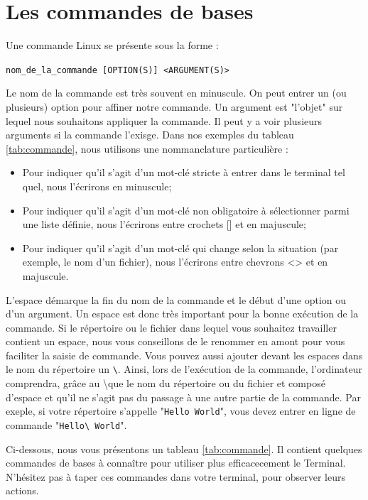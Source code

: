 \documentclass[12pt]{book}
\begin{document}
\section{Les commandes de bases}\label{sec:commandes}
	Une commande Linux se présente sous la forme :
	\begin{center}
		\texttt{nom\_de\_la\_commande [OPTION(S)] <ARGUMENT(S)>}
	\end{center}\par
	Le nom de la commande est très souvent en minuscule.
	On peut entrer un (ou plusieurs) option pour affiner notre commande.
	Un argument est "l'objet" sur lequel nous souhaitons appliquer la commande. Il peut y a voir plusieurs arguments si la commande l'exisge.
	Dans nos exemples du tableau \ref{tab:commande}, nous utilisons une nommanclature particulière :
	\begin{itemize}
		\item Pour indiquer qu'il s'agit d'un mot-clé stricte à entrer dans le terminal tel quel, nous l'écrirons en minuscule;
		\item Pour indiquer qu'il s'agit d'un mot-clé non obligatoire à sélectionner parmi une liste définie, nous l'écrirons entre crochets [] et en majuscule;
		\item Pour indiquer qu'il s'agit d'un mot-clé qui change selon la situation (par exemple, le nom d'un fichier), nous l'écrirons entre chevrons <> et en majuscule.
	\end{itemize}\par
	L'espace démarque la fin du nom de la commande et le début d'une option ou d'un argument.
	Un espace est donc très important pour la bonne exécution de la commande.
	Si le répertoire ou le fichier dans lequel vous souhaitez travailler contient un espace, nous vous conseillons de le renommer en amont pour vous faciliter la saisie de commande.
	Vous pouvez aussi ajouter devant les espaces dans le nom du répertoire un \texttt{\textbackslash }.
	Ainsi, lors de l'exécution de la commande, l'ordinateur comprendra, grâce au \textbackslash que le nom du répertoire ou du fichier et composé d'espace et qu'il ne s'agit pas du passage à une autre partie de la commande.
	Par exeple, si votre répertoire s'appelle "\texttt{Hello World}", vous devez entrer en ligne de commande "\texttt{Hello\textbackslash~World}".\par
	Ci-dessous, nous vous présentons un tableau \ref{tab:commande}.
	Il contient quelques commandes de bases à connaître pour utiliser plus efficacecement le Terminal.
	N'hésitez pas à taper ces commandes dans votre terminal, pour observer leurs actions.\par
\end{document}
